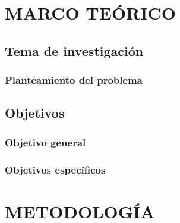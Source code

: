 \documentclass{tesis}
\begin{document}



\setcounter{page}{2}







% 
% 


\newpage
\renewcommand{\thepage}{\arabic{page}}%
\setcounter{page}{1}

\chapter{MARCO TEÓRICO}

\section{Tema de investigación}
 {\MakeUppercase\tema}

\subsection{Planteamiento del problema}





\section{Objetivos}
\subsection{Objetivo general}


\subsection{Objetivos específicos}


\chapter{METODOLOGÍA}
\end{document}
